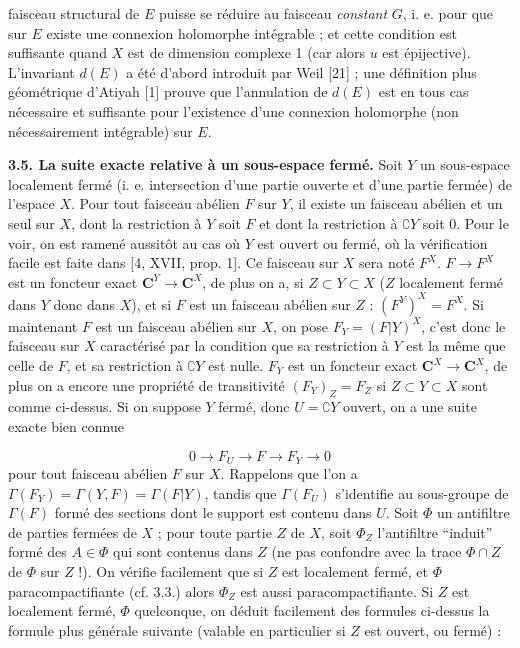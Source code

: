 
faisceau structural de $E$ puisse se réduire au faisceau \textit{constant}
$G$, i. e. pour que sur $E$ existe une connexion holomorphe intégrable ; et
cette condition est suffisante quand $X$ est de dimension complexe 1 (car
alors $u$ est épijective). L'invariant $d(E)$ a été d'abord introduit par
Weil [21] ; une définition plus géométrique d'Atiyah [1] prouve que
l'annulation de $d(E)$ est en tous cas nécessaire et suffisante pour
l'existence d'une connexion holomorphe (non nécessairement intégrable) sur
$E$.

\indent\textbf{3.5. La suite exacte relative à un sous-espace fermé.} Soit $Y$ un
sous-espace localement fermé (i. e. intersection d'une partie ouverte et d'une
partie fermée) de l'espace $X$. Pour tout faisceau abélien $F$ sur $Y$, il
existe un faisceau abélien et un seul sur $X$, dont la restriction à $Y$ soit
$F$ et dont la restriction à $\complement Y$ soit 0. Pour le voir, on est ramené aussitôt
au cas où $Y$ est ouvert ou fermé, où la vérification facile est faite dans
[4, XVII, prop. 1].
Ce faisceau sur $X$ sera noté $F^X$. $F\to F^X$ est un foncteur exact
$\mathbf C^Y\to \mathbf C^X$, de plus on a, si $Z\subset Y\subset X$ ($Z$
localement fermé dans $Y$ donc dans $X$), et si $F$ est un faisceau abélien
sur $Z$ :
$(F^Y)^X=F^X$.
Si maintenant $F$ est un faisceau abélien sur $X$, on pose
$F_Y=(F\vert Y)^X$, c'est donc le faisceau sur $X$ caractérisé par la
condition que sa restriction à $Y$ est la même que celle de $F$, et sa
restriction à $\complement Y$ est nulle. $F_Y$ est un foncteur exact
$\mathbf C^X\to \mathbf C^X$, de plus on a encore une propriété de transitivité
$(F_Y)_Z=F_Z$
si $Z\subset Y\subset X$ sont comme ci-dessus. Si on suppose $Y$ fermé, donc
$U=\complement Y$ ouvert, on a une suite exacte bien connue

\[
0\to F_U\to F\to F_Y\to0
\]
pour tout faisceau abélien $F$ sur $X$. Rappelons que l'on a
$\Gamma(F_Y)=\Gamma(Y,F)=\Gamma(F\vert Y)$, tandis que $\Gamma(F_U)$
s'identifie au sous-groupe de $\Gamma(F)$ formé des sections dont le support
est contenu dans $U$.
Soit $\Phi$ un antifiltre de parties fermées de $X$ ; pour toute partie $Z$
de $X$, soit $\Phi_Z$ l'antifiltre ``induit'' formé des $A\in\Phi$ qui
sont contenus dans $Z$ (ne pas confondre avec la trace $\Phi\cap Z$ de $\Phi$
sur $Z$ !). On vérifie facilement que si $Z$ est localement fermé, et $\Phi$
paracompactifiante (cf. 3.3.) alors $\Phi_Z$ est aussi paracompactifiante. Si
$Z$ est localement fermé, $\Phi$ quelconque, on déduit facilement des formules
ci-dessus la formule plus générale suivante (valable en particulier si $Z$
est ouvert, ou fermé) :


